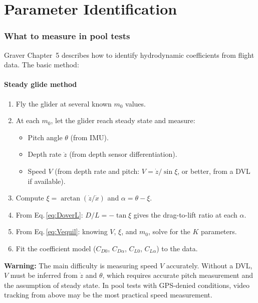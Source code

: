 \documentclass[11pt,a4paper]{article}
\newcommand{\warning}[1]{\par\smallskip\noindent\colorbox{red!8}{\parbox{\dimexpr\linewidth-2\fboxsep}{%
  \small\textbf{Warning:} #1}}\smallskip}
\begin{document}
\part{Parameter Identification}

\section{What to measure in pool tests}
\label{sec:paramid}

Graver Chapter~5 describes how to identify hydrodynamic coefficients from flight
data.  The basic method:

\subsection{Steady glide method}

\begin{enumerate}[nosep]
  \item Fly the glider at several known $m_0$ values.
  \item At each $m_0$, let the glider reach steady state and measure:
    \begin{itemize}[nosep]
      \item Pitch angle $\theta$ (from IMU).
      \item Depth rate $\dot{z}$ (from depth sensor differentiation).
      \item Speed $V$ (from depth rate and pitch: $V=\dot{z}/\sin\xi$,
        or better, from a DVL if available).
    \end{itemize}
  \item Compute $\xi = \arctan(\dot{z}/\dot{x})$ and $\alpha = \theta - \xi$.
  \item From Eq.\,\eqref{eq:DoverL}: $D/L = -\tan\xi$ gives the drag-to-lift ratio
    at each $\alpha$.
  \item From Eq.\,\eqref{eq:Vequil}: knowing $V$, $\xi$, and $m_0$, solve for
    the $K$ parameters.
  \item Fit the coefficient model ($C_{D0}$, $C_{D\alpha}$, $C_{L0}$, $C_{L\alpha}$)
    to the data.
\end{enumerate}

\warning{The main difficulty is measuring speed $V$ accurately.  Without a DVL,
$V$ must be inferred from $\dot{z}$ and $\theta$, which requires accurate pitch
measurement and the assumption of steady state.  In pool tests with GPS-denied
conditions, video tracking from above may be the most practical speed measurement.}
\end{document}
